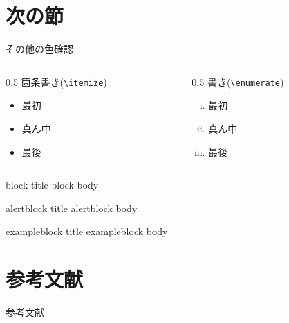 \documentclass[10pt,unicode]{beamer}
\theoremstyle{mystyle}
\begin{document}
  \section{次の節}
  \begin{frame}{その他の色確認}{}
    \begin{columns}
      \begin{column}[t]{0.5\textwidth}
        箇条書き(\texttt{\textbackslash itemize})
        \begin{itemize}
          \item 最初
          \item 真ん中
          \item 最後
        \end{itemize}
      \end{column}
      \begin{column}[t]{0.5\textwidth}
        書き(\texttt{\textbackslash enumerate})
        \begin{enumerate}[(i)]
          \item 最初
          \item 真ん中
          \item 最後
        \end{enumerate}
      \end{column}
    \end{columns}
  
    \begin{block}{block title}
      block body
    \end{block}
    \begin{alertblock}{alertblock title}
      alertblock body
    \end{alertblock}
    \begin{exampleblock}{exampleblock title}
      exampleblock body
    \end{exampleblock}
  \end{frame}

  \section*{参考文献}
  \begin{frame}{参考文献}{}
    
  \end{frame}
\end{document}
